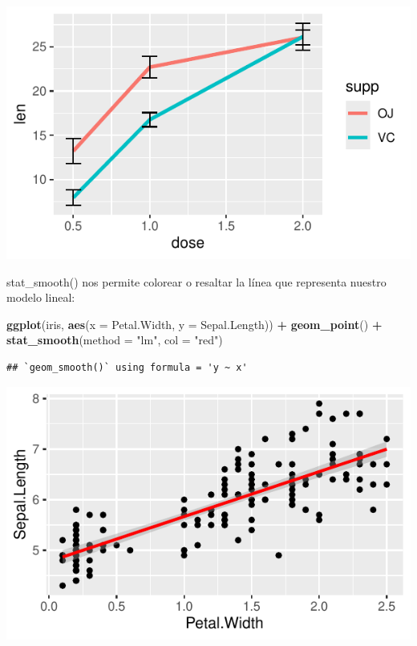 \documentclass[
]{book}
\newenvironment{Shaded}{\begin{snugshade}}{\end{snugshade}}
\newcommand{\AttributeTok}[1]{\textcolor[rgb]{0.13,0.29,0.53}{#1}}
\newcommand{\FunctionTok}[1]{\textcolor[rgb]{0.13,0.29,0.53}{\textbf{#1}}}
\newcommand{\NormalTok}[1]{#1}
\newcommand{\SpecialCharTok}[1]{\textcolor[rgb]{0.81,0.36,0.00}{\textbf{#1}}}
\newcommand{\StringTok}[1]{\textcolor[rgb]{0.31,0.60,0.02}{#1}}
\begin{document}
\begin{center}\includegraphics{R_Manual_files/figure-latex/unnamed-chunk-224-1} \end{center}

stat\_smooth() nos permite colorear o resaltar la línea que representa nuestro modelo lineal:

\begin{Shaded}
\begin{Highlighting}[]
\FunctionTok{ggplot}\NormalTok{(iris, }\FunctionTok{aes}\NormalTok{(}\AttributeTok{x =}\NormalTok{ Petal.Width, }\AttributeTok{y =}\NormalTok{ Sepal.Length)) }\SpecialCharTok{+} 
  \FunctionTok{geom\_point}\NormalTok{() }\SpecialCharTok{+}
  \FunctionTok{stat\_smooth}\NormalTok{(}\AttributeTok{method =} \StringTok{"lm"}\NormalTok{, }\AttributeTok{col =} \StringTok{"red"}\NormalTok{)}
\end{Highlighting}
\end{Shaded}

\begin{verbatim}
## `geom_smooth()` using formula = 'y ~ x'
\end{verbatim}

\begin{center}\includegraphics{R_Manual_files/figure-latex/unnamed-chunk-225-1} \end{center}
\end{document}
